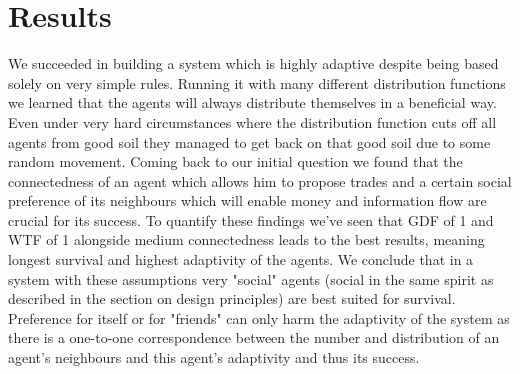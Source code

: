 \documentclass{JASSS}
\begin{document}
	
\section{Results}
We succeeded in building a system which is highly adaptive despite being based solely on very simple rules. Running it with many different distribution functions we learned that the agents will always distribute themselves in a beneficial way. Even under very hard circumstances where the distribution function cuts off all agents from good soil they managed to get back on that good soil due to some random movement. Coming back to our initial question we found that the connectedness of an agent which allows him to propose trades and a certain social preference of its neighbours which will enable money and information flow are crucial for its success. To quantify these findings we've seen that GDF of 1 and WTF of 1 alongside medium connectedness leads to the best results, meaning longest survival and highest adaptivity of the agents. We conclude that in a system with these assumptions very "social" agents (social in the same spirit as described in the section on design principles) are best suited for survival. Preference for itself or for "friends" can only harm the adaptivity of the system as there is a one-to-one correspondence between the number and distribution of an agent's neighbours and this agent's adaptivity and thus its success.  
\end{document}
